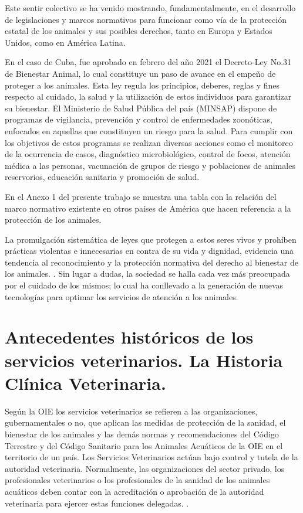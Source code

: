 Este sentir colectivo se ha venido mostrando, fundamentalmente, en el desarrollo de legislaciones y marcos normativos para funcionar como vía de la protección estatal de los animales y sus posibles derechos, tanto en Europa y Estados Unidos, como en América Latina.  

En el caso de Cuba, fue aprobado en febrero del año 2021 el Decreto-Ley No.31 de Bienestar Animal, lo cual constituye un paso de avance en el empeño de proteger a los animales. Esta ley regula los principios, deberes, reglas y fines respecto al cuidado, la salud y la utilización de estos individuos para garantizar su bienestar. El Ministerio de Salud Pública del país (MINSAP) dispone de programas de vigilancia, prevención y control de enfermedades zoonóticas, enfocados en aquellas que constituyen un riesgo para la salud. Para cumplir con los objetivos de estos programas se realizan diversas acciones como el monitoreo de la ocurrencia de casos, diagnóstico microbiológico, control de focos, atención médica a las personas, vacunación de grupos de riesgo y poblaciones de animales reservorios, educación sanitaria y promoción de salud. 

En el Anexo 1 del presente trabajo se muestra una tabla con la relación del marco normativo existente en otros países de América que hacen referencia a la protección de los animales. 

La promulgación sistemática de leyes que protegen a estos seres vivos y prohíben prácticas violentas e innecesarias en contra de su vida y dignidad, evidencia una tendencia al reconocimiento y la protección normativa del derecho al bienestar de los animales. . Sin lugar a dudas, la sociedad se halla cada vez más preocupada por el cuidado de los mismos; lo cual ha conllevado a la generación de nuevas tecnologías para optimar los servicios de atención a los animales.  

\section{Antecedentes históricos de los servicios \newline veterinarios. La Historia Clínica Veterinaria.  }

Según la OIE los servicios veterinarios se refieren a las organizaciones, gubernamentales o no, que aplican las medidas de protección de la sanidad, el bienestar de los animales y las demás normas y recomendaciones del Código Terrestre y del Código Sanitario para los Animales Acuáticos de la OIE en el territorio de un país. Los Servicios Veterinarios actúan bajo control y tutela de la autoridad veterinaria. Normalmente, las organizaciones del sector privado, los profesionales veterinarios o los profesionales de la sanidad de los animales acuáticos deben contar con la acreditación o aprobación de la autoridad veterinaria para ejercer estas funciones delegadas. . 


